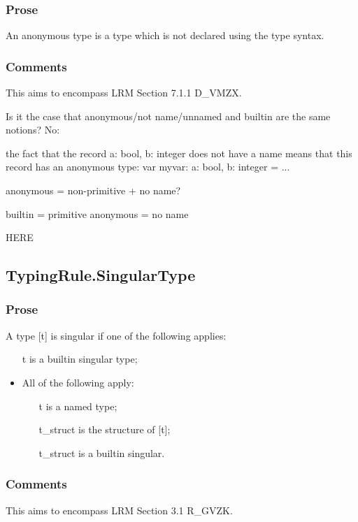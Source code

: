 \documentclass{book}
\begin{document}
    \subsubsection{Prose} 
    An anonymous type is a type which is not declared using the type syntax. 

    \subsubsection{Comments}
    This aims to encompass LRM Section 7.1.1 D\_VMZX.

    Is it the case that anonymous/not name/unnamed and builtin are the same notions?
    No:

    the fact that the record {a: bool, b: integer} does not have a name means that this record has an anonymous type:
    var myvar: {a: bool, b: integer} = ...

    anonymous = non-primitive + no name?

    builtin = primitive
    anonymous = no name

    HERE

\subsection{TypingRule.SingularType}

    \subsubsection{Prose}
    A type [t] is singular if one of the following applies:
    \begin{itemize}
    \item  [t] is a builtin singular type;
    \item  All of the following apply:
      \begin{itemize}
      \item  [t] is a named type;
      \item  [t\_struct] is the structure of [t];
      \item  [t\_struct] is a builtin singular.
      \end{itemize} 
    \end{itemize}

    \subsubsection{Comments}
    This aims to encompass LRM Section 3.1 R\_GVZK.
\end{document}
